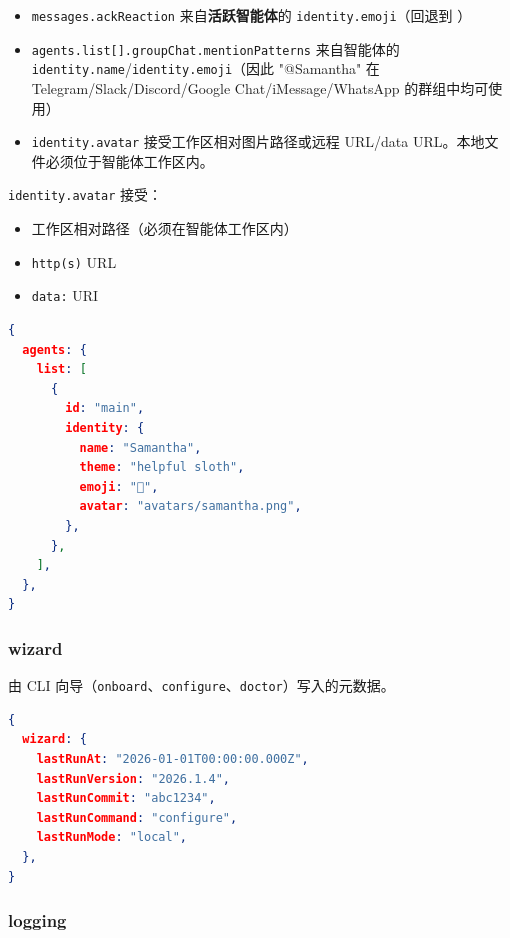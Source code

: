 \begin{itemize}
  \item \texttt{messages.ackReaction} 来自\textbf{活跃智能体}的 \texttt{identity.emoji}（回退到 ）
  \item \texttt{agents.list[].groupChat.mentionPatterns} 来自智能体的 \texttt{identity.name}/\texttt{identity.emoji}（因此 "@Samantha" 在 Telegram/Slack/Discord/Google Chat/iMessage/WhatsApp 的群组中均可使用）
  \item \texttt{identity.avatar} 接受工作区相对图片路径或远程 URL/data URL。本地文件必须位于智能体工作区内。
\end{itemize}


\texttt{identity.avatar} 接受：

\begin{itemize}
  \item 工作区相对路径（必须在智能体工作区内）
  \item \texttt{http(s)} URL
  \item \texttt{data:} URI
\end{itemize}


\begin{lstlisting}[language=json]
{
  agents: {
    list: [
      {
        id: "main",
        identity: {
          name: "Samantha",
          theme: "helpful sloth",
          emoji: "🦥",
          avatar: "avatars/samantha.png",
        },
      },
    ],
  },
}
\end{lstlisting}


\subsubsection{wizard}


由 CLI 向导（\texttt{onboard}、\texttt{configure}、\texttt{doctor}）写入的元数据。

\begin{lstlisting}[language=json]
{
  wizard: {
    lastRunAt: "2026-01-01T00:00:00.000Z",
    lastRunVersion: "2026.1.4",
    lastRunCommit: "abc1234",
    lastRunCommand: "configure",
    lastRunMode: "local",
  },
}
\end{lstlisting}


\subsubsection{logging}


